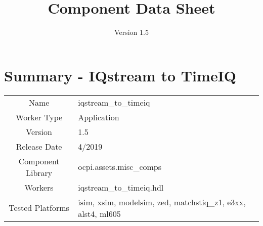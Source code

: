 \iffalse
This file is protected by Copyright. Please refer to the COPYRIGHT file
distributed with this source distribution.

This file is part of OpenCPI <http://www.opencpi.org>

OpenCPI is free software: you can redistribute it and/or modify it under the
terms of the GNU Lesser General Public License as published by the Free Software
Foundation, either version 3 of the License, or (at your option) any later
version.

OpenCPI is distributed in the hope that it will be useful, but WITHOUT ANY
WARRANTY; without even the implied warranty of MERCHANTABILITY or FITNESS FOR A
PARTICULAR PURPOSE. See the GNU Lesser General Public License for more details.

You should have received a copy of the GNU Lesser General Public License along
with this program. If not, see <http://www.gnu.org/licenses/>.
\fi

\def\docTitle{Component Data Sheet}
\def\docVersion{1.5}
\def\snippetpath{../../../../../../doc/av/tex/snippets}


\date{Version \docVersion} %
\title{\docTitle}
\lhead{\small{\docTitle}}

\usepackage{longtable} %

\def\comp{iqstream\_to\_timeiq}
\def\ecomp{iqstream_to_timeiq}
\def\Comp{IQstream to TimeIQ}
\graphicspath{ {figures/} }



\section*{Summary - \Comp}
\begin{tabular}{|c|M{13.5cm}|}
	\hline
	                  &                        							\\
	\hline
	Name              & \comp                  							\\
	\hline
	Worker Type       & Application            							\\
	\hline
	Version           & \docVersion                  							\\
	\hline
	Release Date      & 4/2019           						\\
	\hline
	Component Library & ocpi.assets.misc\_comps 					\\
	\hline
	Workers           & \comp.hdl              							\\
	\hline
	Tested Platforms  & isim, xsim, modelsim, zed, matchstiq\_z1, e3xx, alst4, ml605	\\
	\hline
\end{tabular}

